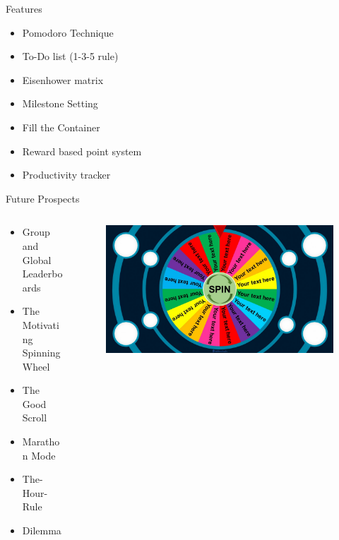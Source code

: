 \documentclass{beamer}
\begin{document}
	\begin{frame}{Features}
                \begin{itemize}
		\item Pomodoro Technique
                \item To-Do list (1-3-5 rule)
                \item Eisenhower matrix
                \item Milestone Setting
                \item Fill the Container
                \item Reward based point system
                \item Productivity tracker
                \end{itemize}
        \end{frame}


	\begin{frame}{Future Prospects}
	\begin{columns}
        \begin{column}{0.7\textwidth} %
        \begin{itemize}

		\item Group and Global Leaderboards
                \item The Motivating Spinning Wheel
                \item The Good Scroll
                \item Marathon Mode
                \item The-Hour-Rule
		\item Dilemma

	\end{itemize}

        \end{column}
        
        \begin{column}{0.3\textwidth} %
            \begin{figure}
                \includegraphics[width=\textwidth]{the-spinning-wheel.jpg}
            \end{figure}
        \end{column}
	\end{columns}
	\end{frame}
\end{document}
